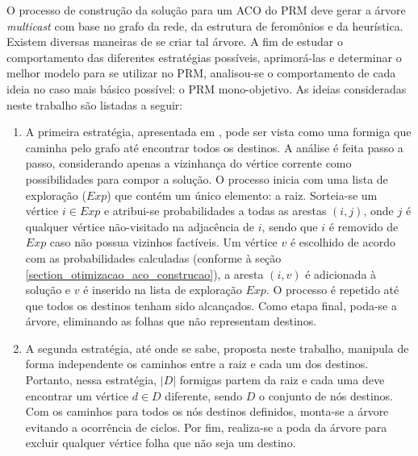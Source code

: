 O processo de construção da solução para um ACO do PRM deve gerar a árvore \textit{multicast} com base no grafo da rede, da estrutura de feromônios e da heurística. Existem diversas maneiras de se criar tal árvore. A fim de estudar o comportamento das diferentes estratégias possíveis, aprimorá-las e determinar o melhor modelo para se utilizar no PRM, analisou-se o comportamento de cada ideia no caso mais básico possível: o PRM mono-objetivo. As ideias consideradas neste trabalho são listadas a seguir:

\begin{enumerate}
	\item A primeira estratégia, apresentada em \cite{Pinto2005}, pode ser vista como uma formiga que caminha pelo grafo até encontrar todos os destinos. A análise é feita passo a passo, considerando apenas a vizinhança do vértice corrente como possibilidades para compor a solução. O processo inicia com uma lista de exploração ($Exp$) que contém um único elemento: a raiz. Sorteia-se um vértice $i \in Exp$ e atribui-se probabilidades a todas as arestas $(i, j)$, onde $j$ é qualquer vértice não-visitado na adjacência de $i$, sendo que $i$ é removido de $Exp$ caso não possua vizinhos factíveis. Um vértice $v$ é escolhido de acordo com as probabilidades calculadas (conforme à seção \ref{section_otimizacao_aco_construcao}), a aresta $(i, v)$ é adicionada à solução e $v$ é inserido na lista de exploração $Exp$. O processo é repetido até que todos os destinos tenham sido alcançados. Como etapa final, poda-se a árvore, eliminando as folhas que não representam destinos.
	\item A segunda estratégia, até onde se sabe, proposta neste trabalho, manipula de forma independente os caminhos entre a raiz e cada um dos destinos. Portanto, nessa estratégia, $|D|$ formigas partem da raiz e cada uma deve encontrar um vértice $d \in D$ diferente, sendo $D$ o conjunto de nós destinos. Com os caminhos para todos os nós destinos definidos, monta-se a árvore evitando a ocorrência de ciclos. Por fim, realiza-se a poda da árvore para excluir qualquer vértice folha que não seja um destino. %

\end{enumerate}
